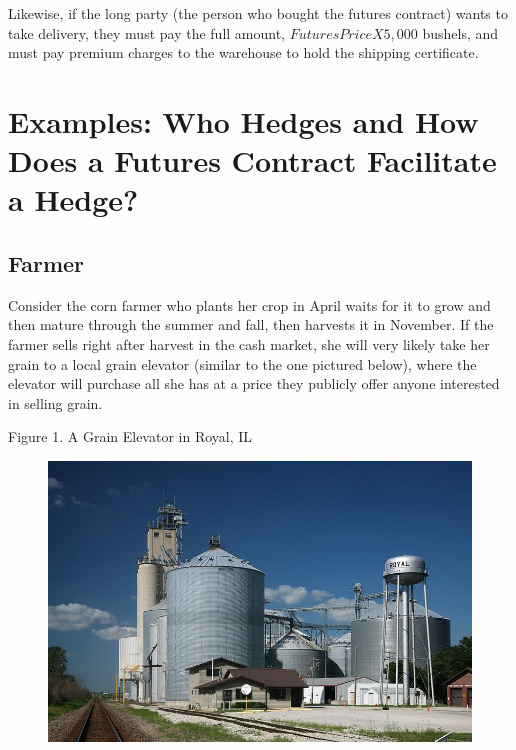 \documentclass[
  letterpaper,
  DIV=11,
  numbers=noendperiod]{scrreprt}
\begin{document}
Likewise, if the long party (the person who bought the futures contract)
wants to take delivery, they must pay the full amount,
\(Futures Price X 5,000\) bushels, and must pay premium charges to the
warehouse to hold the shipping certificate.

\hypertarget{examples-who-hedges-and-how-does-a-futures-contract-facilitate-a-hedge}{%
\section{Examples: Who Hedges and How Does a Futures Contract Facilitate
a
Hedge?}\label{examples-who-hedges-and-how-does-a-futures-contract-facilitate-a-hedge}}

\hypertarget{farmer}{%
\subsection{Farmer}\label{farmer}}

Consider the corn farmer who plants her crop in April waits for it to
grow and then mature through the summer and fall, then harvests it in
November. If the farmer sells right after harvest in the cash market,
she will very likely take her grain to a local grain elevator (similar
to the one pictured below), where the elevator will purchase all she has
at a price they publicly offer anyone interested in selling grain.

Figure 1. A Grain Elevator in Royal, IL

\begin{figure}

{\centering 

\href{https://commons.wikimedia.org/wiki/File:Grain_elevators_in_Royal,_IL.}{\includegraphics{assets/Grain_elevator_royal_IL.jpg}}

}

\end{figure}
\end{document}
